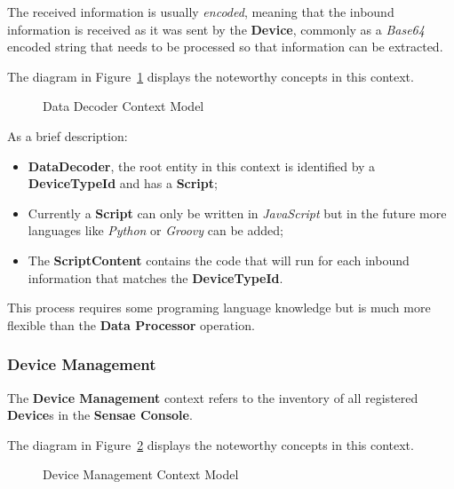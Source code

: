The received information is usually \textit{encoded}, meaning that the inbound information is received as it was sent by the \textbf{Device}, commonly as a \textit{Base64} encoded string that needs to be processed so that information can be extracted.

The diagram in Figure~\ref{fig:design:domain:bounded_contexts:decoder:diagram} displays the noteworthy concepts in this context.

\begin{figure}[H]
   \centering
  \resizebox{\columnwidth}{!}
  {
     
  }
  \caption[Data Decoder Context Model]{Data Decoder Context Model}
  \label{fig:design:domain:bounded_contexts:decoder:diagram}
\end{figure}

As a brief description:

\begin{itemize}
   \item \textbf{DataDecoder}, the root entity in this context is identified by a \textbf{DeviceTypeId} and has a \textbf{Script};
   \item Currently a \textbf{Script} can only be written in \textit{JavaScript} but in the future more languages like \textit{Python} or \textit{Groovy} can be added;
   \item The \textbf{ScriptContent} contains the code that will run for each inbound information that matches the \textbf{DeviceTypeId}.
\end{itemize}

This process requires some programing language knowledge but is much more flexible than the \textbf{Data Processor} operation.

\subsubsection*{Device Management}
\label{subsubsec:design:domain:bounded_contexts:device}

The \textbf{Device Management} context refers to the inventory of all registered \textbf{Device}s in the \textbf{Sensae Console}.

The diagram in Figure~\ref{fig:design:domain:bounded_contexts:device:diagram} displays the noteworthy concepts in this context.

\begin{figure}[H]
   \centering
  \resizebox{\columnwidth}{!}
  {
     
  }
  \caption[Device Management Context Model]{Device Management Context Model}
  \label{fig:design:domain:bounded_contexts:device:diagram}
\end{figure}

